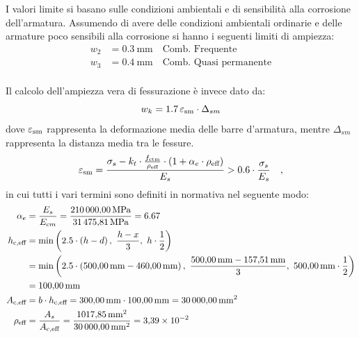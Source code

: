I valori limite si basano sulle condizioni ambientali e di sensibilità alla corrosione dell'armatura.
Assumendo di avere delle condizioni ambientali ordinarie e delle armature poco sensibili alla corrosione si hanno i seguenti limiti di ampiezza:
\begin{equation}
    \begin{split}
        w_2 &= \SI{0.3}{\milli\metre} \quad \text{Comb. Frequente} \\ 
        w_3 &= \SI{0.4}{\milli\metre} \quad \text{Comb. Quasi permanente} \\
    \end{split}
\end{equation}

Il calcolo dell'ampiezza vera di fessurazione è invece dato da:
\begin{equation}
    w_k = 1.7\, \varepsilon_\textup{sm} \cdot \Delta_{sm}
\end{equation}
dove $\varepsilon_\textup{sm}$ rappresenta la deformazione media delle barre d'armatura, mentre $\Delta_{sm}$ rappresenta la distanza media tra le fessure.
\begin{equation}
    \varepsilon_\textup{sm} = \frac{ \sigma_{s} - k_{t} \cdot \frac{ f_\textup{ctm} }{ \rho_\textup{eff} } \cdot \left( 1 + \alpha_{e} \cdot \rho_\textup{eff} \right) }{ E_{s} } > 0.6 \cdot \frac{ \sigma_{s} }{ E_{s} } \quad ,
\end{equation}
in cui tutti i vari termini sono definiti in normativa nel seguente modo:
\[
\begin{split}
    \alpha_{e} &= \frac{ E_{s} }{ E_{cm} }  = \frac{ \SI{210000.00}{\mega\pascal} }{ \SI{31475.81}{\mega\pascal} } = 6.67  
    \\
    h_\textup{c,eff} 
    &= \min { \left( 2.5 \cdot \left( h - d \right) ,\  \frac{ h - x }{ 3 } ,\  h \cdot \frac{1} { 2 } \right) }  \\ 
    & = \min { \left( 2.5 \cdot \left( \SI{500.00}{\milli\metre} - \SI{460.00}{\milli\metre} \right) ,\  \frac{ \SI{500.00}{\milli\metre} - \SI{157.51}{\milli\metre} }{ 3 } ,\  \SI{500.00}{\milli\metre} \cdot \frac{1} { 2 } \right) } \\
    &= \SI{100.00}{\milli\metre}  \\
    A_\textup{c,eff} &= b \cdot h_\textup{c,eff}  = \SI{300.00}{\milli\metre} \cdot \SI{100.00}{\milli\metre} = \SI{30000.00}{\milli\metre\squared}  \\
    \rho_\textup{eff} &= \frac{ A_{s} }{ A_\textup{c,eff} }  = \frac{ \SI{1017.85}{\milli\metre\squared} }{ \SI{30000.00}{\milli\metre\squared} } = \num{3.39e-2 }  \\
\end{split}
\]
